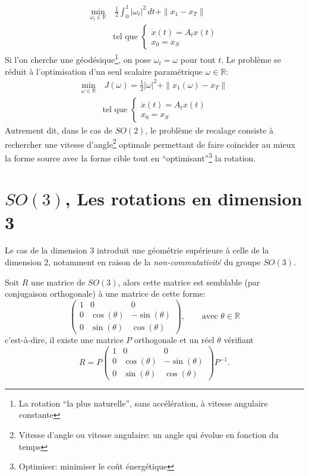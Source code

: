 \documentclass[12pt]{report}
\begin{document}
\[
\begin{aligned}
\min_{\omega_t\in \mathbb{R}}&~\frac{1}{2}\int_{0}^{1}|\omega_t|^2\,dt+\|x_1-x_T\|\\
&\text{tel que }\left\{\begin{array}{ll}\dot{x}(t)=A_{t}x(t)\\x_0=x_S\end{array}\right.
\end{aligned}
\]
Si l'on cherche une géodésique\footnote{La rotation ``la plus naturelle'', sans accélération, à vitesse angulaire constante}, on pose $\omega_t=\omega$ pour tout $t$. Le problème se réduit à l'optimisation d'un seul scalaire paramétrique $\omega\in\mathbb{R}$:
\[
\begin{aligned}
\min_{\omega\in \mathbb{R}}&~J(\omega)=\frac{1}{2}|\omega|^2+\|x_1(\omega)-x_T\|\\
&\text{tel que }\left\{\begin{array}{ll}\dot{x}(t)=A_{t}x(t)\\x_0=x_S\end{array}\right.
\end{aligned}
\]
Autrement dit, dans le cas de $SO(2)$, le problème de recalage consiste à rechercher une vitesse d'angle\footnote{Vitesse d'angle ou vitesse angulaire: un angle qui évolue en fonction du temps} optimale permettant de faire coïncider au mieux la forme source avec la forme cible tout en ``optimisant''\footnote{Optimiser: minimiser le coût énergétique} la rotation.


\section{\texorpdfstring{$SO(3)$}{SO (3)}, Les rotations en dimension 3}
Le cas de la dimension $3$ introduit une géométrie supérieure à celle de la dimension $2$, notamment en raison de la \textit{non-commutativité} du groupe $SO(3)$.

\begin{proposition}
Soit $R$ une matrice de $SO(3)$, alors cette matrice est semblable (par conjugaison orthogonale) à une matrice de cette forme:
\[
\begin{pmatrix}1 &0 &0\\ 0 &\cos(\theta) &-\sin(\theta)\\ 0 &\sin(\theta) &\cos(\theta)\end{pmatrix},\qquad\text{avec }\theta\in\mathbb{R}
\]
c'est-à-dire, il existe une matrice $P$ orthogonale et un réel $\theta$ vérifiant
\[
R=P\begin{pmatrix}1 &0 &0\\ 0 &\cos(\theta) &-\sin(\theta)\\ 0 &\sin(\theta) &\cos(\theta)\end{pmatrix}P^{-1}.
\]
\end{proposition}
\end{document}
